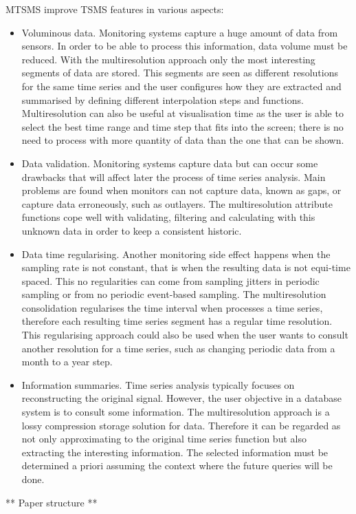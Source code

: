 MTSMS improve TSMS features in various aspects:
\begin{itemize}

\item Voluminous data. Monitoring systems capture a huge amount of
  data from sensors. In order to be able to process this information,
  data volume must be reduced. With the multiresolution approach only
  the most interesting segments of data are stored. This segments are
  seen as different resolutions for the same time series and the user
  configures how they are extracted and summarised by defining
  different interpolation steps and functions. Multiresolution can
  also be useful at visualisation time as the user is able to select
  the best time range and time step that fits into the screen; there
  is no need to process with more quantity of data than the one that
  can be shown.

\item Data validation. Monitoring systems capture data but can occur
  some drawbacks that will affect later the process of time series
  analysis. Main problems are found when monitors can not capture
  data, known as gaps, or capture data erroneously, such as outlayers.
  The multiresolution attribute functions cope well with validating,
  filtering and calculating with this unknown data in order to keep a
  consistent historic.

\item Data time regularising. Another monitoring side effect happens when
  the sampling rate is not constant, that is when the resulting data
  is not equi-time spaced. This no regularities can come from sampling
  jitters in periodic sampling or from no periodic event-based
  sampling. The multiresolution consolidation regularises the time
  interval when processes a time series, therefore each resulting time
  series segment has a regular time resolution. This regularising
  approach could also be used when the user wants to consult another
  resolution for a time series, such as changing periodic data from a
  month to a year step.

\item Information summaries. Time series analysis typically focuses on
  reconstructing the original signal. However, the user objective in a
  database system is to consult some information. The multiresolution
  approach is a lossy compression storage solution for data. Therefore
  it can be regarded as not only approximating to the
  original time series function but also extracting the interesting
  information. The selected information must be determined a priori
  assuming the context where the future queries will be done.

\end{itemize}





** Paper structure **\todo{}










